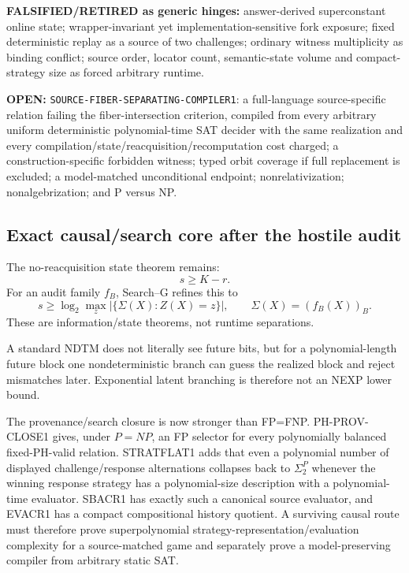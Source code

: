 \documentclass[11pt]{article}
\begin{document}
\textbf{FALSIFIED/RETIRED as generic hinges:} answer-derived
superconstant online state; wrapper-invariant yet implementation-sensitive
fork exposure; fixed deterministic replay as a source of two challenges;
ordinary witness multiplicity as binding conflict; source order, locator
count, semantic-state volume and compact-strategy size as forced arbitrary
runtime.

\textbf{OPEN:} \texttt{SOURCE-FIBER-SEPARATING-COMPILER1}: a full-language
source-specific relation failing the fiber-intersection criterion, compiled
from every arbitrary uniform deterministic polynomial-time SAT decider with
the same realization and every compilation/state/reacquisition/recomputation
cost charged; a construction-specific forbidden witness; typed orbit coverage
if full replacement is excluded; a model-matched unconditional endpoint;
nonrelativization; nonalgebrization; and P versus NP.

\subsection{Exact causal/search core after the hostile audit}

The no-reacquisition state theorem remains:
\[
\boxed{s\ge K-r.}
\]
For an audit family \(f_B\), Search--G refines this to
\[
\boxed{
s\ge
\log_2\max_z
\left|\{\Sigma(X):Z(X)=z\}\right|,
\qquad
\Sigma(X)=(f_B(X))_B.
}
\]
These are information/state theorems, not runtime separations.

A standard NDTM does not literally see future bits, but for a polynomial-length future block one
nondeterministic branch can guess the realized block and reject mismatches later. Exponential latent
branching is therefore not an NEXP lower bound.

The provenance/search closure is now stronger than FP=FNP. PH-PROV-CLOSE1 gives, under \(P=NP\),
an FP selector for every polynomially balanced fixed-PH-valid relation. STRATFLAT1 adds that even a
polynomial number of displayed challenge/response alternations collapses back to \(\Sigma_2^P\)
whenever the winning response strategy has a polynomial-size description with a polynomial-time
evaluator. SBACR1 has exactly such a canonical source evaluator, and EVACR1 has a compact
compositional history quotient. A surviving causal route must therefore prove superpolynomial
strategy-representation/evaluation complexity for a source-matched game and separately prove a
model-preserving compiler from arbitrary static SAT.
\end{document}
